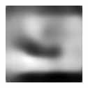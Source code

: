 \begin{figure}[H]
\begin{subfigure}[t]{0.13\textwidth}
  \end{subfigure}
  \begin{subfigure}[t]{0.13\textwidth}
    \centering
    \includegraphics[width=\linewidth]{img/one-trial/intermediate-cnnv4/prediction_2.png}
  \end{subfigure}
  \\
    \vspace{0.1cm}
  

\end{figure}
